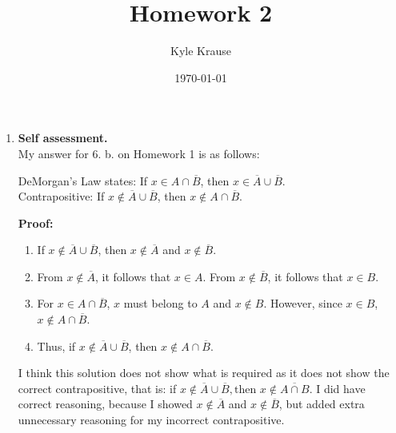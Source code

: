 \documentclass{article}
\title{Homework 2}
\author{Kyle Krause}
\date{\today}
\begin{document}
\maketitle

\begin{enumerate}


    \item \textbf{Self assessment.} \\
    My answer for 6. b. on Homework 1 is as follows: \\
    \begin{algorithm}
    DeMorgan’s Law states:  If $x \in A \cap \overline{B}$, then $x \in \overline{A} \cup \overline{B}$. \\
    Contrapositive:  If $x \notin \overline{A} \cup \overline{B}$, then $x \notin A \cap \overline{B}$.

    \textbf{Proof:}
    \begin{enumerate}
        \item If $x \notin \overline{A} \cup \overline{B}$, then $x \notin \overline{A}$ and $x \notin \overline{B}$.
        \item From $x \notin \overline{A}$, it follows that $x \in A$.  
        From $x \notin \overline{B}$, it follows that $x \in B$.
        \item For $x \in A \cap \overline{B}$, $x$ must belong to $A$ and $x \notin B$. However, since $x \in B$, $x \notin A \cap \overline{B}$.
        \item Thus, if $x \notin \overline{A} \cup \overline{B}$, then $x \notin A \cap \overline{B}$.
    \end{enumerate}
    \end{algorithm}

    I think this solution does not show what is required as it does not show the correct contrapositive, that is: if $x \notin \overline{A} \cup \overline{B}, \text{then } x \notin \overline{ A \cap B}$. I did have correct reasoning, because I showed $x \notin \overline{A}$ and $x \notin \overline{B}$, but added extra unnecessary reasoning for my incorrect contrapositive.  



\end{enumerate}
\end{document}
